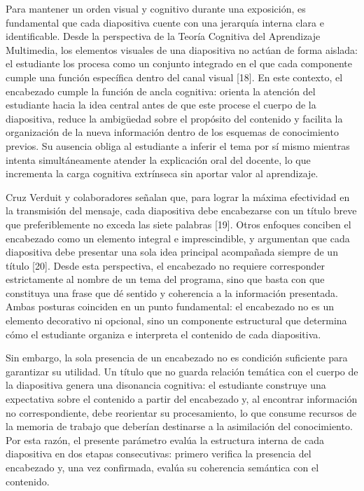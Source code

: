 \documentclass[11pt]{article}
\begin{document}
Para mantener un orden visual y cognitivo durante una exposición, es fundamental que cada diapositiva cuente con una jerarquía interna clara e identificable. Desde la perspectiva de la Teoría Cognitiva del Aprendizaje Multimedia, los elementos visuales de una diapositiva no actúan de forma aislada: el estudiante los procesa como un conjunto integrado en el que cada componente cumple una función específica dentro del canal visual [18]. En este contexto, el encabezado cumple la función de ancla cognitiva: orienta la atención del estudiante hacia la idea central antes de que este procese el cuerpo de la diapositiva, reduce la ambigüedad sobre el propósito del contenido y facilita la organización de la nueva información dentro de los esquemas de conocimiento previos. Su ausencia obliga al estudiante a inferir el tema por sí mismo mientras intenta simultáneamente atender la explicación oral del docente, lo que incrementa la carga cognitiva extrínseca sin aportar valor al aprendizaje.

Cruz Verduit y colaboradores señalan que, para lograr la máxima efectividad en la transmisión del mensaje, cada diapositiva debe encabezarse con un título breve que preferiblemente no exceda las siete palabras [19]. Otros enfoques conciben el encabezado como un elemento integral e imprescindible, y argumentan que cada diapositiva debe presentar una sola idea principal acompañada siempre de un título [20]. Desde esta perspectiva, el encabezado no requiere corresponder estrictamente al nombre de un tema del programa, sino que basta con que constituya una frase que dé sentido y coherencia a la información presentada. Ambas posturas coinciden en un punto fundamental: el encabezado no es un elemento decorativo ni opcional, sino un componente estructural que determina cómo el estudiante organiza e interpreta el contenido de cada diapositiva.

Sin embargo, la sola presencia de un encabezado no es condición suficiente para garantizar su utilidad. Un título que no guarda relación temática con el cuerpo de la diapositiva genera una disonancia cognitiva: el estudiante construye una expectativa sobre el contenido a partir del encabezado y, al encontrar información no correspondiente, debe reorientar su procesamiento, lo que consume recursos de la memoria de trabajo que deberían destinarse a la asimilación del conocimiento. Por esta razón, el presente parámetro evalúa la estructura interna de cada diapositiva en dos etapas consecutivas: primero verifica la presencia del encabezado y, una vez confirmada, evalúa su coherencia semántica con el contenido.
\end{document}

